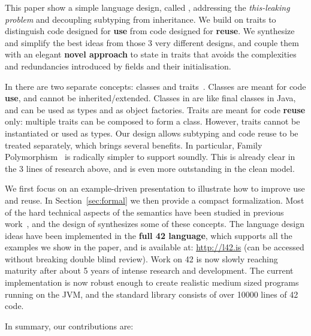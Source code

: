 This paper show a simple language design, called \name,
addressing the \emph{this-leaking problem} and decoupling subtyping from inheritance.
We build on traits to distinguish code designed for
\textbf{use} from code designed for \textbf{reuse}.
We synthesize and simplify the best ideas from those 3 very different designs, and couple them with an elegant \textbf{novel approach} to state in traits that avoids the complexities and redundancies introduced by fields and their initialisation.

In \name there are two separate concepts: classes
and traits~\cite{ducasse2006traits}. Classes are meant for code \textbf{use}, and cannot be inherited/extended. Classes in \name are like final classes in
Java, and can be used as types and as object factories. Traits are meant for code \textbf{reuse} only: multiple traits can be
composed to form a class. However, traits 
cannot be instantiated or used as types. Our design allows
subtyping and code reuse to be treated separately, which brings several benefits. In particular, 
Family Polymorphism~\cite{ernst2004expression} is
radically simpler to support soundly.
This is already clear in the 3 lines of
research above, and is even more outstanding in the clean \name model.

We first focus on an example-driven presentation to illustrate how to
improve use and reuse. 
In Section~\ref{sec:formal} we then provide a compact formalization.
Most of the hard technical aspects of the
semantics have been studied in previous 
work~\cite{Bettini:2010:ISP:1774088.1774530,BETTINI2013521,Bettini2015282,KrogdahlMS09,DBLP:journals/taosd/AxelsenSKM12,DBLP:conf/gpce/AxelsenK12,deep,servetto2014meta,fjig},
and the design of \name synthesizes some of these concepts.
The language design ideas have been implemented in the {\bf full 42 language}, which supports all
the examples we show in the paper, and is available at: \url{http://l42.is} (can be accessed without breaking double blind review).
Work on 42 is now slowly reaching maturity after about 5 years of
intense research and development. The current implementation 
is now robust enough to create realistic medium sized programs running 
on the JVM, and the standard library consists of over 10000 lines of
42 code. 

In summary, our contributions are:


